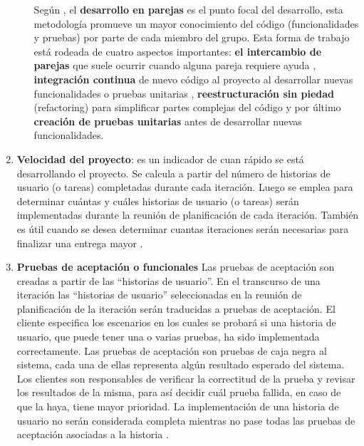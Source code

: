 \begin{enumerate}
\begin{itemize}
		Según \citeauthor{Metodologia_XP_parejas2006}, el \textbf{desarrollo en parejas} es el punto focal del desarrollo, esta metodología promueve un mayor conocimiento del código (funcionalidades y pruebas) por parte de cada miembro del grupo. Esta forma de trabajo está rodeada de cuatro aspectos importantes: \textbf{el intercambio de parejas}  que suele ocurrir cuando alguna pareja requiere ayuda \citep{Metodologia_XP_rotacion2006}, \textbf{integración continua} de nuevo código al proyecto al desarrollar nuevas funcionalidades o pruebas unitarias \citep{Metodologia_XP_integracion2006}, \textbf{reestructuración sin piedad} (refactoring) para simplificar partes complejas del código \citep{Metodologia_XP_refactor2006} y por último \textbf{creación de pruebas unitarias} antes de desarrollar nuevas funcionalidades. \citep{Metodologia_XP_unittest2006}
	\end{itemize}
	
\item \textbf{Velocidad del proyecto}: es un indicador de cuan rápido se está desarrollando el proyecto. Se calcula a partir del número de historias de usuario (o tareas) completadas durante cada iteración. Luego se emplea para determinar cuántas y cuáles historias de usuario (o tareas) serán implementadas durante la reunión de planificación de cada iteración. También es útil cuando se desea determinar cuantas iteraciones serán necesarias para finalizar una entrega mayor \citep{Metodologia_XP_velocidad2006}.

\item \textbf{Pruebas de aceptación o funcionales}
Las pruebas de aceptación son creadas a partir de las ``historias de usuario''. En el transcurso de una iteración las ``historias de usuario'' seleccionadas en la reunión de planificación de la iteración serán traducidas a pruebas de aceptación. El cliente especifica los escenarios en los cuales se probará si una historia de usuario, que puede tener una o varias pruebas, ha sido implementada correctamente.
Las pruebas de aceptación son pruebas de caja negra al sistema, cada una de ellas representa algún resultado esperado del sistema. Los clientes son responsables de verificar la correctitud de la prueba y revisar los resultados de la misma, para así decidir cuál prueba fallida, en caso de que la haya, tiene mayor prioridad. La implementación de una historia de usuario no serán considerada completa mientras no pase todas las pruebas de aceptación asociadas a la historia \citep{Metodologia_XP_testaceptacion2006}.

\end{enumerate}

